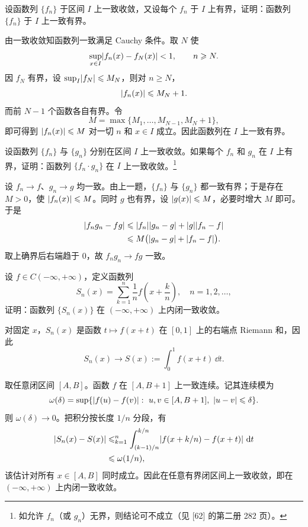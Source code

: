 \begin{xexercise}[11]
设函数列 $\{f_n\}$ 于区间 $I$ 上一致收敛，又设每个 $f_n$ 于 $I$ 上有界，证明：函数列 $\{f_n\}$ 于 $I$ 上一致有界。
\end{xexercise}
\begin{xsolution}
由一致收敛知函数列一致满足 Cauchy 条件。取 $N$ 使
\[
  \sup_{x\in I}\lvert f_n(x)-f_N(x)\rvert<1,
  \qquad n\geqslant N.
\]
因 $f_N$ 有界，设 $\sup_I\lvert f_N\rvert\leqslant M_N$，则对 $n\geqslant N$，
\[
  \lvert f_n(x)\rvert\leqslant M_N+1.
\]
而前 $N-1$ 个函数各自有界。令
\[
  M=\max\{M_1,\ldots,M_{N-1},M_N+1\},
\]
即可得到 $\lvert f_n(x)\rvert\leqslant M$ 对一切 $n$ 和 $x\in I$ 成立。因此函数列在 $I$ 上一致有界。
\end{xsolution}


\begin{xexercise}[12]
设函数列 $\{f_n\}$ 与 $\{g_n\}$ 分别在区间 $I$ 上一致收敛。如果每个 $f_n$ 和 $g_n$ 在 $I$ 上有界，证明：函数列 $\{f_n\cdot g_n\}$ 在 $I$ 上一致收敛。\footnote{如允许 $f_n$（或 $g_n$）无界，则结论可不成立（见 [62] 的第二册 282 页）。}
\end{xexercise}
\begin{xsolution}
设 $f_n\to f$、$g_n\to g$ 均一致。由上一题，$\{f_n\}$ 与 $\{g_n\}$ 都一致有界；于是存在 $M>0$，使 $\lvert f_n(x)\rvert\leqslant M$。同时 $g$ 也有界，设 $\lvert g(x)\rvert\leqslant M$，必要时增大 $M$ 即可。于是
\[
\begin{aligned}
  \lvert f_ng_n-fg\rvert
  &\leqslant\lvert f_n\rvert\lvert g_n-g\rvert+\lvert g\rvert\lvert f_n-f\rvert\\
  &\leqslant M\bigl(\lvert g_n-g\rvert+\lvert f_n-f\rvert\bigr).
\end{aligned}
\]
取上确界后右端趋于 $0$，故 $f_ng_n\to fg$ 一致。
\end{xsolution}


\begin{xexercise}[13]
设 $f\in C(-\infty,+\infty)$，定义函数列
  \[
    S_n(x)=\sum_{k=1}^{n}\frac1n f\left(x+\frac{k}{n}\right),\quad n=1,2,\ldots,
  \]
  证明：函数列 $\{S_n(x)\}$ 在 $(-\infty,+\infty)$ 上内闭一致收敛。
\end{xexercise}
\begin{xsolution}
对固定 $x$，$S_n(x)$ 是函数 $t\mapsto f(x+t)$ 在 $[0,1]$ 上的右端点 Riemann 和，因此
\[
  S_n(x)\to S(x):=\int_0^1f(x+t)\,\dd t.
\]

取任意闭区间 $[A,B]$。函数 $f$ 在 $[A,B+1]$ 上一致连续。记其连续模为
\[
  \omega(\delta)=\sup\{\abs{f(u)-f(v)}:\ u,v\in[A,B+1],\ \abs{u-v}\leqslant\delta\}.
\]
则 $\omega(\delta)\to0$。把积分按长度 $1/n$ 分段，有
\[
\begin{aligned}
  \lvert S_n(x)-S(x)\rvert
  &\leqslant\relax_{k=1}^n\int_{(k-1)/n}^{k/n}
    \lvert f(x+k/n)-f(x+t)\rvert\,\mathop{}\!\mathrm{d} t\\
  &\leqslant\omega(1/n),
\end{aligned}
\]
该估计对所有 $x\in[A,B]$ 同时成立。因此在任意有界闭区间上一致收敛，即在 $(-\infty,+\infty)$ 上内闭一致收敛。
\end{xsolution}


